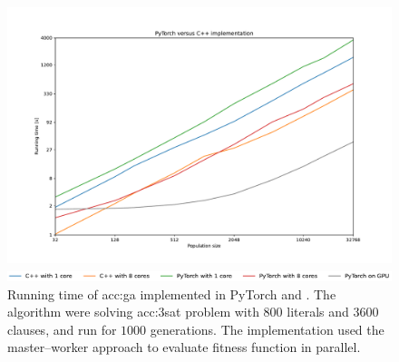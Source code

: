 \begin{figure}[ht!]
    \centering
    \begin{minipage}[t]{0.9\textwidth}
        \includegraphics[width=\textwidth]{img/runs/time_ga_c.pdf}
    \end{minipage}

    \begin{minipage}[t]{0.9\textwidth}
        \includegraphics[width=\textwidth]{img/runs/time_ga_c_legend.pdf}
    \end{minipage}

    \caption[Comparison of PyTorch and \cpp implementation]{Running time of \acrlong{acc:ga} implemented in PyTorch and \cppns. The algorithm were solving \acrshort{acc:3sat} problem with $800$ literals and $3600$ clauses, and run for $1000$ generations. The \cpp implementation used the master--worker approach to evaluate fitness function in parallel.}
\end{figure}




